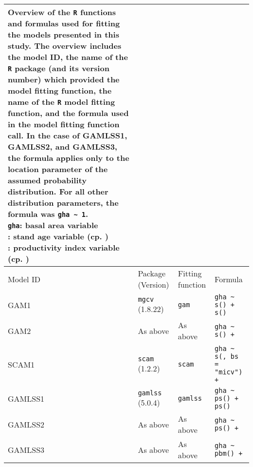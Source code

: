 \begin{table}[H]
  {\tabulinesep=2mm
    \begin{longtabu}{l l l L}
      \caption{Overview of the \texttt{R} functions and formulas used for fitting the models presented in this study. The overview includes
        the model ID,
        the name of the \texttt{R} package (and its version number) which provided the model fitting function,
        the name of the \texttt{R} model fitting function,
        and the formula used in the model fitting function call.
        In the case of GAMLSS1, GAMLSS2, and GAMLSS3, the formula applies only to the location parameter of the assumed probability distribution.
        For all other distribution parameters, the formula was \texttt{gha \textasciitilde{} 1}. \\
        \texttt{gha}: basal area variable \\
        \StandAgeVariableR{}: stand age variable (cp. ) \\
        \ProductivityIndexVariableR{}: productivity index variable (cp. )
        \label{tab:PresentedModelsOverviewFormulas}} \\
      \toprule
      Model ID & Package (Version) & Fitting function & Formula \\
      \midrule
      \endhead
      \bottomrule
      \endlastfoot
      GAM1 & \texttt{mgcv} (1.8.22) & \texttt{gam} & \texttt{gha \textasciitilde{} s(\StandAgeVariableR{}) + s(\ProductivityIndexVariableR{})} \\
      GAM2 & As above & As above & \texttt{gha \textasciitilde{} s(\StandAgeVariableR{}) + \ProductivityIndexVariableR{}} \\
      SCAM1 & \texttt{scam} (1.2.2) & \texttt{scam} & \texttt{gha \textasciitilde{} s(\StandAgeVariableR{}, bs = "micv") + \ProductivityIndexVariableR{}} \\
      GAMLSS1 & \texttt{gamlss} (5.0.4) & \texttt{gamlss} & \texttt{gha \textasciitilde{} ps(\StandAgeVariableR{}) + ps(\ProductivityIndexVariableR{})} \\
      GAMLSS2 & As above & As above & \texttt{gha \textasciitilde{} ps(\StandAgeVariableR{}) + \ProductivityIndexVariableR{}} \\
      GAMLSS3 & As above & As above & \texttt{gha \textasciitilde{} pbm(\StandAgeVariableR{}) + \ProductivityIndexVariableR{}} \\
      \bottomrule
    \end{longtabu}}
\end{table}


